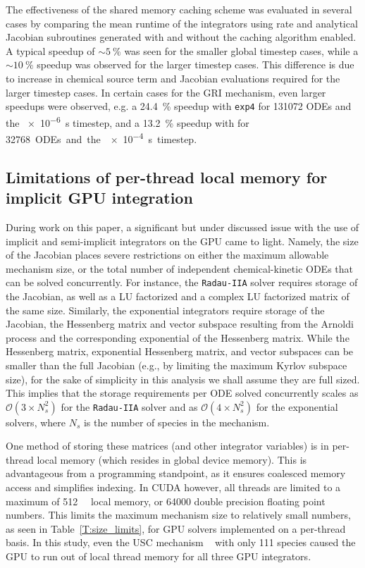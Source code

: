\documentclass[preprint]{elsarticle}
\begin{document}
The effectiveness of the shared memory caching scheme was evaluated in several cases by comparing the mean runtime of the integrators using rate and analytical Jacobian subroutines generated with and without the caching algorithm enabled.
A typical speedup of $\sim\SI{5}{\percent}$ was seen for the smaller global timestep cases, while a $\sim\SI{10}{\percent}$ speedup was observed for the larger timestep cases.
This difference is due to increase in chemical source term and Jacobian evaluations required for the larger timestep cases.
In certain cases for the GRI mechanism, even larger speedups were observed, e.g. a \SI{24.4}{\percent} speedup with \texttt{exp4} for \num{131072} ODEs and the \SI{e-6}{\second} timestep, and a \SI{13.2}{\percent} speedup with  for \SI{32768} ODEs and the \SI{e-4}{\second} timestep.


\subsection{Limitations of per-thread local memory for implicit GPU integration}

During work on this paper, a significant but under discussed issue with the use of implicit and semi-implicit integrators on the GPU came to light.
Namely, the size of the Jacobian places severe restrictions on either the maximum allowable mechanism size, or the total number of independent chemical-kinetic ODEs that can be solved concurrently.
For instance, the \texttt{Radau-IIA} solver requires storage of the Jacobian, as well as a LU factorized and a complex LU factorized matrix of the same size.
Similarly, the exponential integrators require storage of the Jacobian, the Hessenberg matrix and vector subspace resulting from the Arnoldi process and the corresponding exponential of the Hessenberg matrix.
While the Hessenberg matrix, exponential Hessenberg matrix, and vector subspaces can be smaller than the full Jacobian (e.g., by limiting the maximum Kyrlov subspace size), for the sake of simplicity in this analysis we shall assume they are full sized.
This implies that the storage requirements per ODE solved concurrently scales as $\mathcal{O}\left(3 \times N_s^2\right)$ for the \texttt{Radau-IIA} solver and as $\mathcal{O}\left(4 \times N_s^2\right)$ for the exponential solvers, where $N_s$ is the number of species in the mechanism.

One method of storing these matrices (and other integrator variables) is in per-thread local memory (which resides in global device memory).
This is advantageous from a programming standpoint, as it ensures coalesced memory access and simplifies indexing.
In CUDA however, all threads are limited to a maximum of \SI{512}{\kilo\byte} local memory, or \num{64000} double precision floating point numbers.
This limits the maximum mechanism size to relatively small numbers, as seen in Table~\ref{T:size_limits}, for GPU solvers implemented on a per-thread basis.
In this study, even the USC mechanism ~\cite{Wang:2007} with only 111 species caused the GPU to run out of local thread memory for all three GPU integrators.
\end{document}

